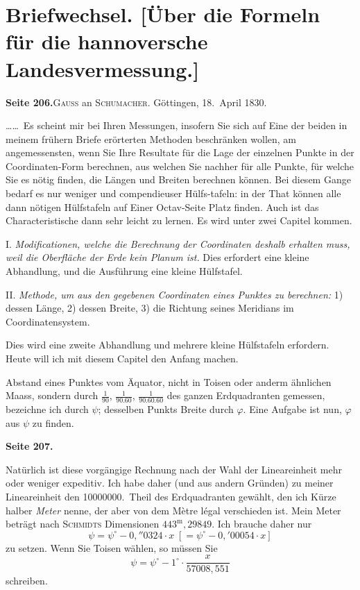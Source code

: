 \documentclass[12pt,a4paper]{article}
\theoremstyle{plain}
\theoremstyle{definition}
\theoremstyle{remark}
\begin{document}
\newpage
\section*{Briefwechsel. [Über die Formeln für die hannoversche Landesvermessung.]}


\textbf{Seite 206.}\quad\textsc{Gauß} an \textsc{Schumacher}. Göttingen, 18.~April 1830.

\ldots\ldots\ Es scheint mir bei Ihren Messungen, insofern Sie sich auf Eine der beiden in meinem frühern Briefe erörterten Methoden beschränken wollen, am angemessensten, wenn Sie Ihre Resultate für die Lage der einzelnen Punkte in der Coordinaten-Form berechnen, aus welchen Sie nachher für alle Punkte, für welche Sie es nötig finden, die Längen und Breiten berechnen können. Bei diesem Gange bedarf es nur weniger und compendieuser Hülfs-\-tafeln: in der That können alle dann nötigen Hülfstafeln auf Einer Octav-Seite Platz finden. Auch ist das Characteristische dann sehr leicht zu lernen. Es wird unter zwei Capitel kommen.

I. \emph{Modificationen, welche die Berechnung der Coordinaten deshalb erhalten muss, weil die Oberfläche der Erde kein Planum ist.} Dies erfordert eine kleine Abhandlung, und die Ausführung eine kleine Hülfstafel.

II. \emph{Methode, um aus den gegebenen Coordinaten eines Punktes zu berechnen:} 1) dessen Länge, 2) dessen Breite, 3) die Richtung seines Meridians im Coordinatensystem.

Dies wird eine zweite Abhandlung und mehrere kleine Hülfstafeln erfordern. Heute will ich mit diesem Capitel den Anfang machen.

Abstand eines Punktes vom Äquator, nicht in Toisen oder anderm ähnlichen Maass, sondern durch $\frac{1}{90}$, $\frac{1}{90.60}$, $\frac{1}{90.60.60}$ des ganzen Erdquadranten gemessen, bezeichne ich durch $\psi$; desselben Punkts Breite durch $\varphi$. Eine Aufgabe ist nun, $\varphi$ aus $\psi$ zu finden.

\newpage
\textbf{Seite 207.}

Natürlich ist diese vorgängige Rechnung nach der Wahl der Lineareinheit mehr oder weniger expeditiv. Ich habe daher (und aus andern Gründen) zu meiner Lineareinheit den 10000000.~Theil des Erdquadranten gewählt, den ich Kürze halber \emph{Meter} nenne, der aber von dem Mètre légal verschieden ist. Mein Meter beträgt nach \textsc{Schmidts} Dimensionen $443^{\mathrm{m}}\!\!,29849$. Ich brauche daher nur
\[
\psi = \psi^{\circ} - 0{,}''0324 \cdot x \;[= \psi^{\circ} - 0{,}'00054 \cdot x]
\]
zu setzen. Wenn Sie Toisen wählen, so müssen Sie
\[
\psi = \psi^{\circ} - 1^{\circ} \cdot \frac{x}{57008{,}551}
\]
schreiben.
\end{document}
